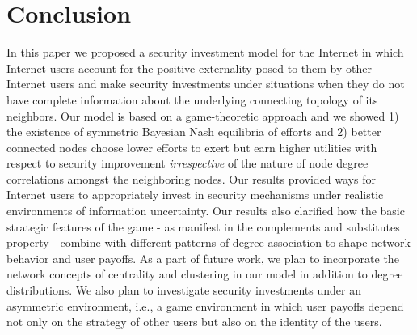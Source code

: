 \documentclass[letterpaper,12pt,onecolumn, nodraft]{IEEEtran}
\begin{document}
\section{Conclusion}
In this paper we proposed a security investment model for the Internet in which Internet users account for the positive externality posed to them by other Internet users and make security investments under situations when they do not have complete information about the underlying connecting topology of its neighbors. Our model is based on a game-theoretic approach and we showed 1) the existence of symmetric Bayesian Nash equilibria of efforts and 2) better connected nodes choose lower efforts to exert but earn higher utilities with respect to security improvement \emph{irrespective} of the nature of node degree correlations amongst the neighboring nodes. Our results provided ways for Internet users to appropriately invest in security mechanisms under realistic environments of information uncertainty. Our results also clarified how the basic strategic features of the game - as manifest in the complements and substitutes property - combine with different patterns of degree association to shape network behavior and user payoffs. As a part of future work, we plan to incorporate the network concepts of centrality and clustering in our model in addition to degree distributions. We also plan to investigate security investments under an asymmetric environment, i.e., a game environment in which user payoffs depend not only on the strategy of other users but also on the identity of the users. 

  
\newpage


\end{document}
